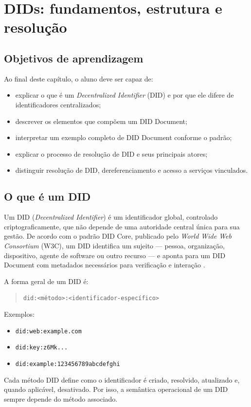 \chapter{DIDs: fundamentos, estrutura e resolução}
\label{chap:dids}

\section{Objetivos de aprendizagem}
Ao final deste capítulo, o aluno deve ser capaz de:
\begin{itemize}[leftmargin=*]
  \item explicar o que é um \textit{Decentralized Identifier} (DID) e por que ele difere de identificadores centralizados;
  \item descrever os elementos que compõem um DID Document;
  \item interpretar um exemplo completo de DID Document conforme o padrão;
  \item explicar o processo de resolução de DID e seus principais atores;
  \item distinguir resolução de DID, dereferenciamento e acesso a serviços vinculados.
\end{itemize}
\section{O que é um DID}
Um DID (\textit{Decentralized Identifier}) é um identificador global, controlado criptograficamente, que não depende de uma autoridade central única para sua gestão. De acordo com o padrão DID Core, publicado pelo \textit{World Wide Web Consortium} (W3C), um DID identifica um sujeito --- pessoa, organização, dispositivo, agente de software ou outro recurso --- e aponta para um DID Document com metadados necessários para verificação e interação \citep{w3c_did_core}.

A forma geral de um DID é:
\begin{quote}
\texttt{did:<método>:<identificador-específico>}
\end{quote}

Exemplos:
\begin{itemize}[leftmargin=*]
  \item \texttt{did:web:example.com}
  \item \texttt{did:key:z6Mk...}
  \item \texttt{did:example:123456789abcdefghi}
\end{itemize}

Cada método DID define como o identificador é criado, resolvido, atualizado e, quando aplicável, desativado. Por isso, a semântica operacional de um DID sempre depende do método associado.

